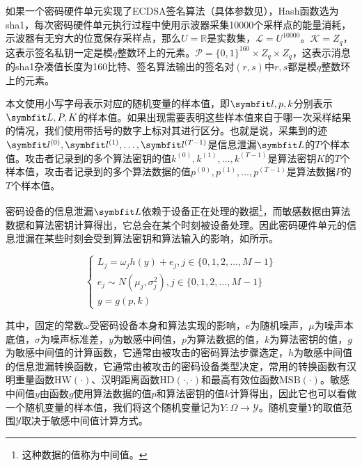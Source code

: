 {	\begin{example}
		如果一个密码硬件单元实现了ECDSA签名算法（具体参数见），Hash函数选为sha1\citep{FIPS180-4}，每次密码硬件单元执行过程中使用示波器采集10000个采样点的能量消耗，示波器有无穷大的位宽保存采样点，那么$U=\mathbb R$是实数集，$\mathcal L=U^{10000}$。$\mathcal K=Z_q$，这表示签名私钥一定是模$q$整数环上的元素。$\mathcal P=\{0,1\}^{160}\times Z_q\times Z_q$，这表示消息的sha1杂凑值长度为160比特、签名算法输出的签名对$(r,s)$中$r,s$都是模$q$整数环上的元素。
	\end{example}
	
	
	本文使用小写字母表示对应的随机变量的样本值，即$\Vector l,p,k$分别表示$\Vector L,P,K$的样本值。如果出现需要表明这些样本值来自于哪一次采样结果的情况，我们使用带括号的数字上标对其进行区分。也就是说，采集到的迹$\Vector {l^{(0)}}, \Vector {l^{(1)}}, \dots, \Vector {l^{(T-1)}}$是信息泄漏$\Vector L$的$T$个样本值。攻击者记录到的多个算法密钥的值$k^{(0)}, k^{(1)}, \dots, k^{(T-1)}$是算法密钥$K$的$T$个样本值，攻击者记录到的多个算法数据的值$p^{(0)}, p^{(1)}, \dots, p^{(T-1)}$是算法数据$P$的$T$个样本值。
	
	密码设备的信息泄漏$\Vector L$依赖于设备正在处理的数据\footnote{这种数据的值称为中间值。}，而敏感数据由算法数据和算法密钥计算得出，它总会在某个时刻被设备处理。因此密码硬件单元的信息泄漏在某些时刻会受到算法密钥和算法输入的影响，如所示。
	
	\begin{equation}
		\begin{cases}
			L_j=\omega_j h(y)+e_j,j\in\{0,1,2,\dots,M-1\}\\
			e_j\sim N(\mu_j,\sigma_j^2),j\in\{0,1,2,\dots,M-1\}\\
			y=g(p,k)
		\end{cases}\label{eq:leakagedetail}
	\end{equation}
	
	\noindent 其中，固定的常数$\omega$受密码设备本身和算法实现的影响，$e$为随机噪声，$\mu$为噪声本底值，$\sigma$为噪声标准差，$y$为敏感中间值，$p$为算法数据的值，$k$为算法密钥的值，$g$为敏感中间值的计算函数，它通常由被攻击的密码算法步骤选定，$h$为敏感中间值的信息泄漏转换函数，它通常由被攻击的密码设备类型决定，常用的转换函数有汉明重量函数$\mathrm {HW}(\cdot)$、汉明距离函数$\mathrm {HD}(\cdot,\cdot)$和最高有效位函数$\mathrm {MSB}(\cdot)$。敏感中间值$y$由函数$g$使用算法数据的值$p$和算法密钥的值$k$计算得出，因此它也可以看做一个随机变量的样本值，我们将这个随机变量记为$Y:\mathcal \Omega\rightarrow \mathcal Y$。随机变量$Y$的取值范围$\mathcal Y$取决于敏感中间值计算方式。
	
}
